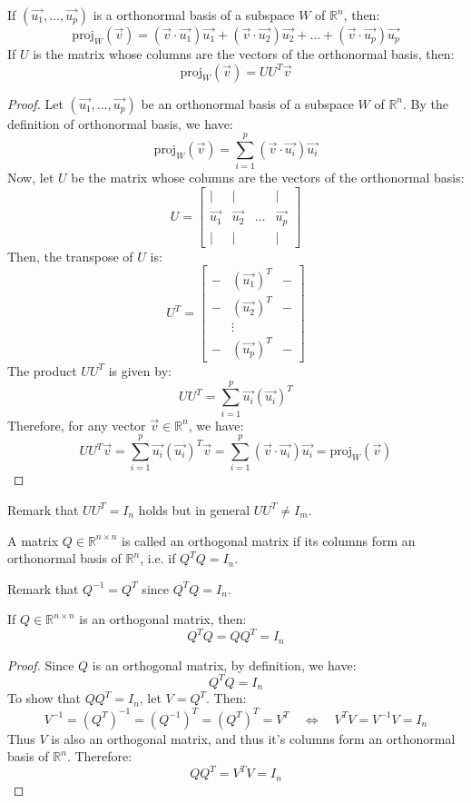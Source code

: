 \begin{theorem}
    If $(\vec{u_1}, \ldots, \vec{u_p})$ is a orthonormal basis of a subspace $W$ of $\mathbb{R}^n$, then:
    \[
        \text{proj}_W(\vec{v}) = (\vec{v} \cdot \vec{u_1}) \vec{u_1} + (\vec{v} \cdot \vec{u_2}) \vec{u_2} + \ldots + (\vec{v} \cdot \vec{u_p}) \vec{u_p}
    \]
    If $U$ is the matrix whose columns are the vectors of the orthonormal basis, then:
    \[
        \text{proj}_W(\vec{v}) = U U^T \vec{v}
    \]
\end{theorem}
\begin{proof}
    Let $(\vec{u_1}, \ldots, \vec{u_p})$ be an orthonormal basis of a subspace $W$ of $\mathbb{R}^n$. By the definition of orthonormal basis, we have:
    \[
        \text{proj}_W(\vec{v}) = \sum_{i=1}^{p} (\vec{v} \cdot \vec{u_i}) \vec{u_i}
    \]
    Now, let $U$ be the matrix whose columns are the vectors of the orthonormal basis:
    \[
        U = \begin{bmatrix}
            | & | & & | \\
            \vec{u_1} & \vec{u_2} & \ldots & \vec{u_p} \\
            | & | & & |
        \end{bmatrix}
    \]
    Then, the transpose of $U$ is:
    \[
        U^T = \begin{bmatrix}
            - & (\vec{u_1})^T & - \\
            - & (\vec{u_2})^T & - \\
            & \vdots & \\
            - & (\vec{u_p})^T & -
        \end{bmatrix}
    \]
    The product $U U^T$ is given by:
    \[
        U U^T = \sum_{i=1}^{p} \vec{u_i} (\vec{u_i})^T
    \]
    Therefore, for any vector $\vec{v} \in \mathbb{R}^n$, we have:
    \[
        U U^T \vec{v} = \sum_{i=1}^{p} \vec{u_i} (\vec{u_i})^T \vec{v} = \sum_{i=1}^{p} (\vec{v} \cdot \vec{u_i}) \vec{u_i} = \text{proj}_W(\vec{v})
    \]
\end{proof}
Remark that $U U^T = I_n$ holds but in general $U U^T \neq I_m$.

\begin{definition}
    A matrix $Q \in \mathbb{R}^{n \times n}$ is called an orthogonal matrix if its columns form an orthonormal basis of $\mathbb{R}^n$, i.e. if $Q^T Q = I_n$.
\end{definition}
Remark that $Q^{-1} = Q^T$ since $Q^T Q = I_n$.

\begin{theorem}
    If $Q \in \mathbb{R}^{n \times n}$ is an orthogonal matrix, then:
    \[
        Q^T Q = Q Q^T = I_n
    \]
\end{theorem}
\begin{proof}
    Since $Q$ is an orthogonal matrix, by definition, we have:
    \[
        Q^T Q = I_n
    \]
    To show that $Q Q^T = I_n$, let $V = Q^T$. Then:
    \[
        V^{-1} = (Q^T)^{-1} = (Q^{-1})^T = (Q^T)^T = V^T \quad \iff \quad V^T V = V^{-1} V = I_n
    \]
    Thus $V$ is also an orthogonal matrix, and thus it's columns form an orthonormal basis of $\mathbb{R}^n$. Therefore:
    \[
        Q Q^T = V^T V = I_n
    \]
\end{proof}

